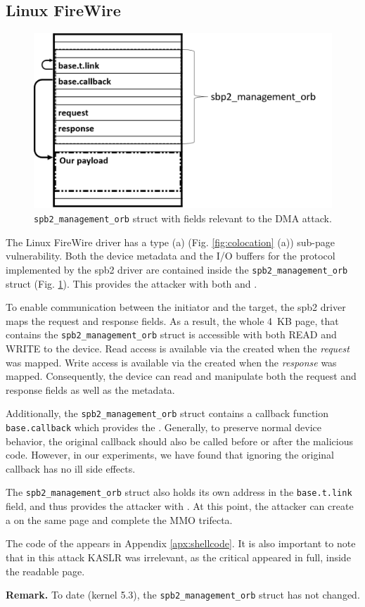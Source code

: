 \subsection{Linux FireWire} \label{sec:sbp2_attack}
\begin{figure}
    \centering
    \includegraphics[width=1\linewidth]{figs/sbp.png}
    \caption{\texttt{spb2\_management\_orb} struct with fields relevant to the DMA attack.}
    \label{fig:orb}
\end{figure}

The Linux FireWire driver has a type (a) (Fig. \ref{fig:colocation} (a)) sub-page vulnerability. Both the device metadata and the I/O buffers for the \spb{} protocol implemented by the spb2 driver are contained inside the \texttt{spb2\_management\_orb} struct (Fig. \ref{fig:orb}). This provides the attacker with both \means{} and \oportunity{}.

To enable communication between the initiator and the target, the spb2 driver maps the request and response fields. As a result, the whole 4~KB page, that contains the \texttt{spb2\_management\_orb} struct is accessible with both READ and WRITE to the device. Read access is available via the \iova{} created when the \emph{request} was mapped. Write access is available via the \iova{} created when the \emph{response} was mapped. Consequently, the device can read and manipulate both the request and response fields as well as the metadata. 

Additionally, the \texttt{spb2\_management\_orb} struct contains a callback function \texttt{base.callback} which provides the \oportunity{}. Generally, to preserve normal device behavior, the original callback should also be called before or after the malicious code. However, in our experiments, we have found that ignoring the original callback has no ill side effects. 

The \texttt{spb2\_management\_orb} struct also holds its own address in the \texttt{base.t.link} field, and thus provides the attacker with \means{}. At this point, the attacker can create a \mabaf{} on the same page and complete the MMO trifecta. 

The code of the \mabaf{} appears in Appendix \ref{apx:shellcode}. It is also important to note that in this attack KASLR was irrelevant, as the critical \kva{} appeared in full, inside the readable page.

\smallskip
\noindent \textbf{Remark.} To date (kernel 5.3), the \texttt{spb2\_management\_orb} struct has not changed.